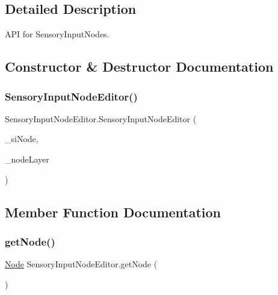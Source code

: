 \subsection{Detailed Description}
A\+PI for Sensory\+Input\+Nodes. 



\subsection{Constructor \& Destructor Documentation}
\mbox{\label{class_sensory_input_node_editor_aa2b8400dc6ba926026c2580ed83fdc25}} 
\subsubsection{\texorpdfstring{Sensory\+Input\+Node\+Editor()}{SensoryInputNodeEditor()}}
{\footnotesize\ttfamily Sensory\+Input\+Node\+Editor.\+Sensory\+Input\+Node\+Editor (\begin{DoxyParamCaption}\item[{\mbox{\hyperlink{class_sensory_input_node}{Sensory\+Input\+Node}}}]{\+\_\+si\+Node,  }\item[{int}]{\+\_\+node\+Layer }\end{DoxyParamCaption})}



\subsection{Member Function Documentation}
\mbox{\label{class_sensory_input_node_editor_ab6f6a94004254d8bba213a6e91fcc946}} 
\subsubsection{\texorpdfstring{get\+Node()}{getNode()}}
{\footnotesize\ttfamily \mbox{\hyperlink{class_node}{Node}} Sensory\+Input\+Node\+Editor.\+get\+Node (\begin{DoxyParamCaption}{ }\end{DoxyParamCaption})}



